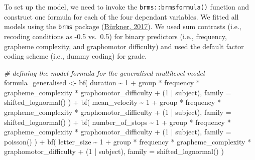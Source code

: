 \documentclass[
  11pt,
  english,
  ,doc,mask,floatsintext]{apa6}
\newenvironment{Shaded}{}{}
\newcommand{\AttributeTok}[1]{\textcolor[rgb]{0.49,0.56,0.16}{#1}}
\newcommand{\CommentTok}[1]{\textcolor[rgb]{0.38,0.63,0.69}{\textit{#1}}}
\newcommand{\DecValTok}[1]{\textcolor[rgb]{0.25,0.63,0.44}{#1}}
\newcommand{\FunctionTok}[1]{\textcolor[rgb]{0.02,0.16,0.49}{#1}}
\newcommand{\NormalTok}[1]{#1}
\newcommand{\OtherTok}[1]{\textcolor[rgb]{0.00,0.44,0.13}{#1}}
\newcommand{\SpecialCharTok}[1]{\textcolor[rgb]{0.25,0.44,0.63}{#1}}
\begin{document}
To set up the model, we need to invoke the \texttt{brms::brmsformula()} function and construct one formula for each of the four dependant variables. We fitted all models using the \texttt{brms} package (\protect\hyperlink{ref-R-brms_a}{Bürkner, 2017}). We used sum contrasts (i.e., recoding conditions as -0.5 vs.~0.5) for binary predictors (i.e., frequency, grapheme complexity, and graphomotor difficulty) and used the default factor coding scheme (i.e., dummy coding) for grade.

\begin{Shaded}
\begin{Highlighting}[]
\CommentTok{\# defining the model formula for the generalised multilevel model}
\NormalTok{formula\_generalised }\OtherTok{\textless{}{-}}
    \FunctionTok{bf}\NormalTok{(}
\NormalTok{        duration }\SpecialCharTok{\textasciitilde{}} \DecValTok{1} \SpecialCharTok{+}\NormalTok{ group }\SpecialCharTok{*}\NormalTok{ frequency }\SpecialCharTok{*}\NormalTok{ grapheme\_complexity }\SpecialCharTok{*}
\NormalTok{            graphomotor\_difficulty }\SpecialCharTok{+}\NormalTok{ (}\DecValTok{1} \SpecialCharTok{|}\NormalTok{ subject),}
        \AttributeTok{family =} \FunctionTok{shifted\_lognormal}\NormalTok{()}
\NormalTok{        ) }\SpecialCharTok{+}
    \FunctionTok{bf}\NormalTok{(}
\NormalTok{        mean\_velocity }\SpecialCharTok{\textasciitilde{}} \DecValTok{1} \SpecialCharTok{+}\NormalTok{ group }\SpecialCharTok{*}\NormalTok{ frequency }\SpecialCharTok{*}\NormalTok{ grapheme\_complexity }\SpecialCharTok{*}
\NormalTok{            graphomotor\_difficulty }\SpecialCharTok{+}\NormalTok{ (}\DecValTok{1} \SpecialCharTok{|}\NormalTok{ subject),}
        \AttributeTok{family =} \FunctionTok{shifted\_lognormal}\NormalTok{()}
\NormalTok{        ) }\SpecialCharTok{+}
    \FunctionTok{bf}\NormalTok{(}
\NormalTok{        number\_of\_stops }\SpecialCharTok{\textasciitilde{}} \DecValTok{1} \SpecialCharTok{+}\NormalTok{ group }\SpecialCharTok{*}\NormalTok{ frequency }\SpecialCharTok{*}\NormalTok{ grapheme\_complexity }\SpecialCharTok{*}
\NormalTok{            graphomotor\_difficulty }\SpecialCharTok{+}\NormalTok{ (}\DecValTok{1} \SpecialCharTok{|}\NormalTok{ subject),}
        \AttributeTok{family =} \FunctionTok{poisson}\NormalTok{()}
\NormalTok{        ) }\SpecialCharTok{+}
    \FunctionTok{bf}\NormalTok{(}
\NormalTok{        letter\_size }\SpecialCharTok{\textasciitilde{}} \DecValTok{1} \SpecialCharTok{+}\NormalTok{ group }\SpecialCharTok{*}\NormalTok{ frequency }\SpecialCharTok{*}\NormalTok{ grapheme\_complexity }\SpecialCharTok{*}
\NormalTok{            graphomotor\_difficulty }\SpecialCharTok{+}\NormalTok{ (}\DecValTok{1} \SpecialCharTok{|}\NormalTok{ subject),}
        \AttributeTok{family =} \FunctionTok{shifted\_lognormal}\NormalTok{()}
\NormalTok{        )}


\end{Highlighting}
\end{Shaded}
\end{document}

